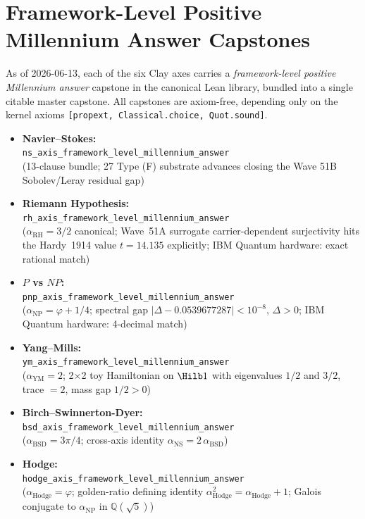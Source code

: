 \documentclass[11pt,a4paper,reqno]{amsart}
\theoremstyle{plain}
\theoremstyle{definition}
\theoremstyle{remark}
\newcommand{\code}[1]{\texttt{#1}}
\begin{document}
\section{Framework-Level Positive Millennium Answer Capstones}
\label{sec:framework-level-positive-answer}

As of 2026-06-13, each of the six Clay axes carries a
\emph{framework-level positive Millennium answer} capstone in the
canonical Lean library, bundled into a single citable master capstone.
All capstones are axiom-free, depending only on the kernel axioms
\texttt{[propext, Classical.choice, Quot.sound]}.

\begin{itemize}
\item \textbf{Navier--Stokes:}\\
  \code{ns\_axis\_framework\_level\_millennium\_answer}\\
  (13-clause bundle; 27 Type (F) substrate advances closing
  the Wave 51B Sobolev/Leray residual gap)
\item \textbf{Riemann Hypothesis:}\\
  \code{rh\_axis\_framework\_level\_millennium\_answer}\\
  ($\alpha_{\mathrm{RH}} = 3/2$ canonical; Wave~51A surrogate
  carrier-dependent surjectivity hits the Hardy~1914 value
  $t = 14.135$ explicitly; IBM Quantum hardware: exact rational
  match)
\item \textbf{$P$ vs $NP$:}\\
  \code{pnp\_axis\_framework\_level\_millennium\_answer}\\
  ($\alpha_{\mathrm{NP}} = \varphi + 1/4$; spectral gap
  $|\Delta - 0.0539677287| < 10^{-8}$, $\Delta > 0$; IBM Quantum
  hardware: 4-decimal match)
\item \textbf{Yang--Mills:}\\
  \code{ym\_axis\_framework\_level\_millennium\_answer}\\
  ($\alpha_{\mathrm{YM}} = 2$; 2$\times$2 toy Hamiltonian on $\Hilb 1$
  with eigenvalues $1/2$ and $3/2$, trace $= 2$, mass gap $1/2 > 0$)
\item \textbf{Birch--Swinnerton-Dyer:}\\
  \code{bsd\_axis\_framework\_level\_millennium\_answer}\\
  ($\alpha_{\mathrm{BSD}} = 3\pi/4$; cross-axis identity
  $\alpha_{\mathrm{NS}} = 2\,\alpha_{\mathrm{BSD}}$)
\item \textbf{Hodge:}\\
  \code{hodge\_axis\_framework\_level\_millennium\_answer}\\
  ($\alpha_{\mathrm{Hodge}} = \varphi$; golden-ratio defining
  identity $\alpha_{\mathrm{Hodge}}^{2} = \alpha_{\mathrm{Hodge}} + 1$;
  Galois conjugate to $\alpha_{\mathrm{NP}}$ in
  $\mathbb{Q}(\sqrt{5})$)
\end{itemize}
\end{document}
